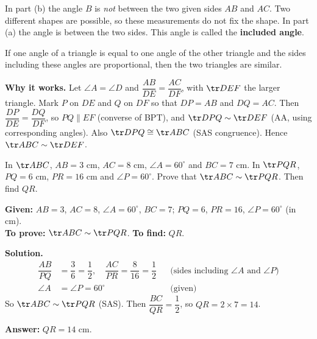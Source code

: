 In part (b) the angle $B$ is \emph{not} between the two given sides $AB$ and $AC$. Two different shapes are possible, so these measurements do not fix the shape. In part (a) the angle is between the two sides. This angle is called the \textbf{included angle}.

\begin{theorem}
If one angle of a triangle is equal to one angle of the other triangle and the sides including these angles are proportional, then the two triangles are similar.
\end{theorem}

\textbf{Why it works.} Let $\angle A=\angle D$ and $\dfrac{AB}{DE}=\dfrac{AC}{DF}$, with $\tr DEF$ the larger triangle. Mark $P$ on $DE$ and $Q$ on $DF$ so that $DP=AB$ and $DQ=AC$. Then $\dfrac{DP}{DE}=\dfrac{DQ}{DF}$, so $PQ\parallel EF$ (converse of BPT), and $\tr DPQ\sim\tr DEF$ (AA, using corresponding angles). Also $\tr DPQ\cong\tr ABC$ (SAS congruence). Hence $\tr ABC\sim\tr DEF$.


\begin{example}
In $\tr ABC$, $AB=3$ cm, $AC=8$ cm, $\angle A=60^\circ$ and $BC=7$ cm. In $\tr PQR$, $PQ=6$ cm, $PR=16$ cm and $\angle P=60^\circ$. Prove that $\tr ABC\sim\tr PQR$. Then find $QR$.


\textbf{Given:} $AB=3$, $AC=8$, $\angle A=60^\circ$, $BC=7$; $PQ=6$, $PR=16$, $\angle P=60^\circ$ (in cm).\\
\textbf{To prove:} $\tr ABC\sim\tr PQR$. \textbf{To find:} $QR$.

\textbf{Solution.}
\[
\begin{aligned}
\dfrac{AB}{PQ}&=\dfrac36=\dfrac12,\quad \dfrac{AC}{PR}=\dfrac8{16}=\dfrac12 &&\text{(sides including $\angle A$ and $\angle P$)}\\
\angle A&=\angle P=60^\circ &&\text{(given)}
\end{aligned}
\]
So $\tr ABC\sim\tr PQR$ (SAS). Then $\dfrac{BC}{QR}=\dfrac12$, so $QR=2\times7=14$.

\textbf{Answer:} $QR=14$ cm.
\end{example}

